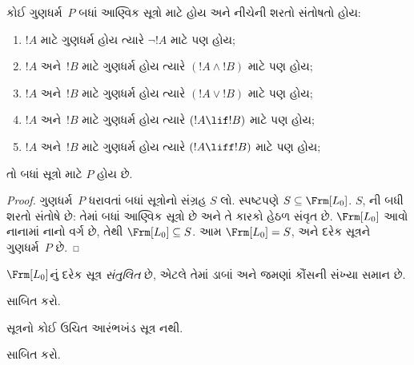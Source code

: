 \begin{thm}
  કોઈ ગુણધર્મ~$P$ બધાં આણ્વિક સૂત્રો માટે હોય અને નીચેની
  શરતો સંતોષતો હોય:
  \begin{enumerate}
    \item $!A$ માટે ગુણધર્મ હોય ત્યારે $\lnot !A$ માટે
      પણ હોય;
    \item $!A$ અને~$!B$ માટે ગુણધર્મ હોય ત્યારે
      $(!A \land !B)$ માટે પણ હોય;
    \item $!A$ અને~$!B$ માટે ગુણધર્મ હોય ત્યારે
      $(!A \lor !B)$ માટે પણ હોય;
    \item $!A$ અને~$!B$ માટે ગુણધર્મ હોય ત્યારે
      $(!A \lif !B)$ માટે પણ હોય;
    \item $!A$ અને~$!B$ માટે ગુણધર્મ હોય ત્યારે
      $(!A \liff !B)$ માટે પણ હોય;
  \end{enumerate}
  તો બધાં સૂત્રો માટે $P$ હોય છે.
\end{thm}

\begin{proof}
  ગુણધર્મ~$P$ ધરાવતાં બધાં સૂત્રોનો સંગ્રહ $S$ લો. સ્પષ્ટપણે
  $S \subseteq \Frm[L_0]$. $S$, ની બધી
  શરતો સંતોષે છે: તેમાં બધાં આણ્વિક સૂત્રો છે અને તે
  કારકો હેઠળ સંવૃત છે. $\Frm[L_0]$ આવો નાનામાં નાનો વર્ગ છે,
  તેથી $\Frm[L_0] \subseteq S$. આમ $\Frm[L_0]=S$, અને દરેક સૂત્રને
  ગુણધર્મ~$P$ છે.
\end{proof}

\begin{prop}
   $\Frm[L_0]$નું દરેક સૂત્ર \emph{સંતુલિત} છે, એટલે તેમાં
   ડાબાં અને જમણાં કૌંસની સંખ્યા સમાન છે.
\end{prop}

\begin{prob}
 સાબિત કરો.
\end{prob}

\begin{prop} 
સૂત્રનો કોઈ ઉચિત આરંભખંડ સૂત્ર નથી.
\end{prop}

\begin{prob}
   સાબિત કરો.
\end{prob}

